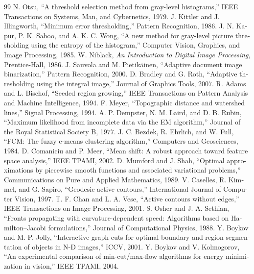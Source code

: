 \documentclass[12pt,openany,oneside]{book}
\begin{document}
\backmatter
\renewcommand{\bibname}{\rl{منابع منتخب فصل}}
\begin{latin}
\begin{thebibliography}{99}
 N. Otsu, ``A threshold selection method from gray-level histograms,'' IEEE Transactions on Systems, Man, and Cybernetics, 1979.
 J. Kittler and J. Illingworth, ``Minimum error thresholding,'' Pattern Recognition, 1986.
 J. N. Kapur, P. K. Sahoo, and A. K. C. Wong, ``A new method for gray-level picture thresholding using the entropy of the histogram,'' Computer Vision, Graphics, and Image Processing, 1985.
 W. Niblack, \textit{An Introduction to Digital Image Processing}, Prentice-Hall, 1986.
 J. Sauvola and M. Pietikäinen, ``Adaptive document image binarization,'' Pattern Recognition, 2000.
 D. Bradley and G. Roth, ``Adaptive thresholding using the integral image,'' Journal of Graphics Tools, 2007.
 R. Adams and L. Bischof, ``Seeded region growing,'' IEEE Transactions on Pattern Analysis and Machine Intelligence, 1994.
 F. Meyer, ``Topographic distance and watershed lines,'' Signal Processing, 1994.
 A. P. Dempster, N. M. Laird, and D. B. Rubin, ``Maximum likelihood from incomplete data via the EM algorithm,'' Journal of the Royal Statistical Society B, 1977.
 J. C. Bezdek, R. Ehrlich, and W. Full, ``FCM: The fuzzy c-means clustering algorithm,'' Computers and Geosciences, 1984.
 D. Comaniciu and P. Meer, ``Mean shift: A robust approach toward feature space analysis,'' IEEE TPAMI, 2002.
 D. Mumford and J. Shah, ``Optimal approximations by piecewise smooth functions and associated variational problems,'' Communications on Pure and Applied Mathematics, 1989.
 V. Caselles, R. Kimmel, and G. Sapiro, ``Geodesic active contours,'' International Journal of Computer Vision, 1997.
 T. F. Chan and L. A. Vese, ``Active contours without edges,'' IEEE Transactions on Image Processing, 2001.
 S. Osher and J. A. Sethian, ``Fronts propagating with curvature-dependent speed: Algorithms based on Hamilton--Jacobi formulations,'' Journal of Computational Physics, 1988.
 Y. Boykov and M.-P. Jolly, ``Interactive graph cuts for optimal boundary and region segmentation of objects in N-D images,'' ICCV, 2001.
 Y. Boykov and V. Kolmogorov, ``An experimental comparison of min-cut/max-flow algorithms for energy minimization in vision,'' IEEE TPAMI, 2004.

\end{thebibliography}
\end{latin}
\end{document}
